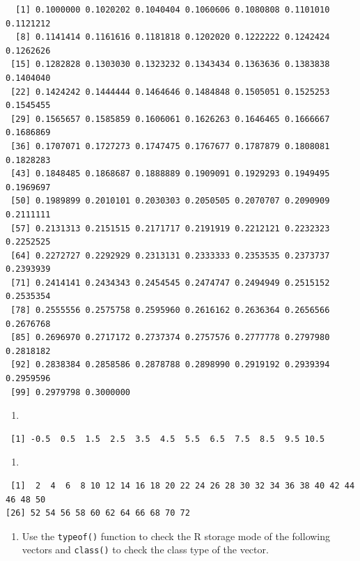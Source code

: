 \documentclass[
  letterpaper,
  DIV=11,
  numbers=noendperiod]{scrreprt}
\providecommand{\tightlist}{%
  \setlength{\itemsep}{0pt}\setlength{\parskip}{0pt}}\usepackage{longtable,booktabs,array}
\begin{document}
\begin{verbatim}
  [1] 0.1000000 0.1020202 0.1040404 0.1060606 0.1080808 0.1101010 0.1121212
  [8] 0.1141414 0.1161616 0.1181818 0.1202020 0.1222222 0.1242424 0.1262626
 [15] 0.1282828 0.1303030 0.1323232 0.1343434 0.1363636 0.1383838 0.1404040
 [22] 0.1424242 0.1444444 0.1464646 0.1484848 0.1505051 0.1525253 0.1545455
 [29] 0.1565657 0.1585859 0.1606061 0.1626263 0.1646465 0.1666667 0.1686869
 [36] 0.1707071 0.1727273 0.1747475 0.1767677 0.1787879 0.1808081 0.1828283
 [43] 0.1848485 0.1868687 0.1888889 0.1909091 0.1929293 0.1949495 0.1969697
 [50] 0.1989899 0.2010101 0.2030303 0.2050505 0.2070707 0.2090909 0.2111111
 [57] 0.2131313 0.2151515 0.2171717 0.2191919 0.2212121 0.2232323 0.2252525
 [64] 0.2272727 0.2292929 0.2313131 0.2333333 0.2353535 0.2373737 0.2393939
 [71] 0.2414141 0.2434343 0.2454545 0.2474747 0.2494949 0.2515152 0.2535354
 [78] 0.2555556 0.2575758 0.2595960 0.2616162 0.2636364 0.2656566 0.2676768
 [85] 0.2696970 0.2717172 0.2737374 0.2757576 0.2777778 0.2797980 0.2818182
 [92] 0.2838384 0.2858586 0.2878788 0.2898990 0.2919192 0.2939394 0.2959596
 [99] 0.2979798 0.3000000
\end{verbatim}

\begin{enumerate}
\def\labelenumi{\roman{enumi}.}
\setcounter{enumi}{6}
\tightlist
\item
\end{enumerate}

\begin{verbatim}
 [1] -0.5  0.5  1.5  2.5  3.5  4.5  5.5  6.5  7.5  8.5  9.5 10.5
\end{verbatim}

\begin{enumerate}
\def\labelenumi{\roman{enumi}.}
\setcounter{enumi}{7}
\tightlist
\item
\end{enumerate}

\begin{verbatim}
 [1]  2  4  6  8 10 12 14 16 18 20 22 24 26 28 30 32 34 36 38 40 42 44 46 48 50
[26] 52 54 56 58 60 62 64 66 68 70 72
\end{verbatim}

\begin{enumerate}
\def\labelenumi{\arabic{enumi}.}
\setcounter{enumi}{1}
\tightlist
\item
  Use the \texttt{typeof()} function to check the R storage mode of the
  following vectors and \texttt{class()} to check the class type of the
  vector.
\end{enumerate}
\end{document}
